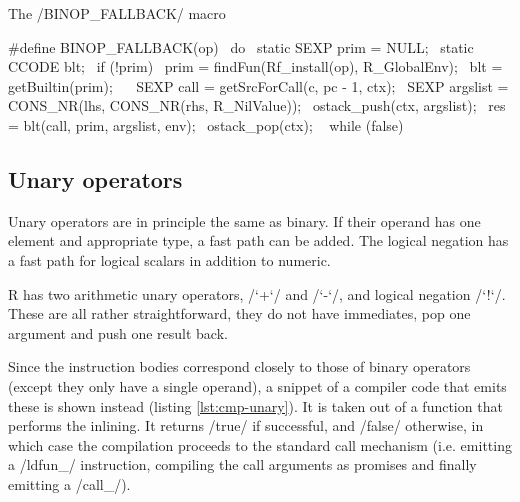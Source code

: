\begin{listing}[htbp]
  \caption{\label{lst:eq3}The \cinline/BINOP_FALLBACK/ macro}
  \begin{ccode}
#define BINOP_FALLBACK(op)                                            \
do {                                                                  \
    static SEXP prim = NULL;                                          \
    static CCODE blt;                                                 \
    if (!prim) {                                                      \
        prim = findFun(Rf_install(op), R_GlobalEnv);                  \
        blt = getBuiltin(prim);                                       \
    }                                                                 \
    SEXP call = getSrcForCall(c, pc - 1, ctx);                        \
    SEXP argslist = CONS_NR(lhs, CONS_NR(rhs, R_NilValue));           \
    ostack_push(ctx, argslist);                                       \
    res = blt(call, prim, argslist, env);                             \
    ostack_pop(ctx);                                                  \
} while (false)
  \end{ccode}
\end{listing}


\subsection{Unary operators}

Unary operators are in principle the same as binary. If their operand has one element and appropriate type, a fast path can be added. The logical negation has a fast path for logical scalars in addition to numeric.

R has two arithmetic unary operators, \rinline/`+`/ and \rinline/`-`/, and logical negation \rinline/`!`/. These are all rather straightforward, they do not have immediates, pop one argument and push one result back.

Since the instruction bodies correspond closely to those of binary operators (except they only have a single operand), a snippet of a compiler code that emits these is shown instead (listing \ref{lst:cmp-unary}). It is taken out of a function that performs the inlining. It returns \cppinline/true/ if successful, and \cppinline/false/ otherwise, in which case the compilation proceeds to the standard call mechanism (i.e. emitting a \cinline/ldfun_/ instruction, compiling the call arguments as promises and finally emitting a \cinline/call_/).


